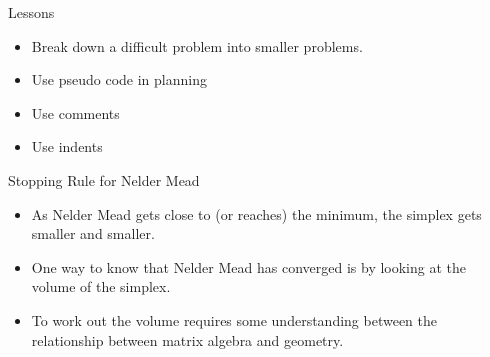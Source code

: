 \documentclass[10pt]{beamer}
\begin{document}
                                                                                              \begin{frame}{Lessons}
                                                                                                \begin{itemize}
                                                                                                \item Break down a difficult problem into smaller problems.

                                                                                                \item Use pseudo code in planning

                                                                                                \item Use comments

                                                                                                \item Use indents
                                                                                                \end{itemize}
                                                                                              \end{frame}
                                                                                              \begin{frame}{Stopping Rule for Nelder Mead}
                                                                                                \begin{itemize}
                                                                                                \item As Nelder Mead gets close to (or reaches) the minimum, the simplex gets smaller and smaller.

                                                                                                \item One way to know that Nelder Mead has converged is by looking at the volume of the simplex.

                                                                                                \item To work out the volume requires some understanding between the relationship between matrix algebra and geometry.
                                                                                                \end{itemize}
                                                                                              \end{frame}
\end{document}
